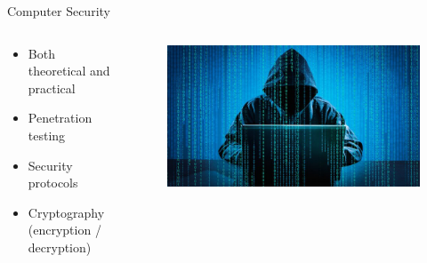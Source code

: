 \documentclass{beamer}
\begin{document}
\begin{frame}{Computer Security}
	\begin{columns}
		\begin{column}{.45\textwidth}
			\begin{itemize}
				\item Both theoretical and practical
				\item Penetration testing
				\item Security protocols
				\item Cryptography (encryption / decryption)
			\end{itemize}
		\end{column}
		\begin{column}{.55\textwidth}
			\begin{figure}
				\includegraphics[width=\linewidth]{img/hacker.jpg}
			\end{figure}
		\end{column}
	\end{columns}
\end{frame}
\end{document}
